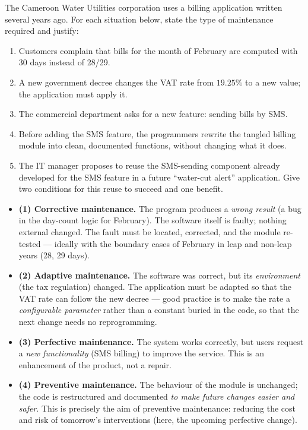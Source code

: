 \documentclass[11pt]{article}
\begin{document}
\begin{exoresolu}
The Cameroon Water Utilities corporation uses a billing application written several years ago. For each situation below, state the type of maintenance required and justify:
\begin{enumerate}
\item[(1)] Customers complain that bills for the month of February are computed with 30 days instead of 28/29.
\item[(2)] A new government decree changes the VAT rate from $19.25\%$ to a new value; the application must apply it.
\item[(3)] The commercial department asks for a new feature: sending bills by SMS.
\item[(4)] Before adding the SMS feature, the programmers rewrite the tangled billing module into clean, documented functions, without changing what it does.
\item[(5)] The IT manager proposes to reuse the SMS-sending component already developed for the SMS feature in a future ``water-cut alert'' application. Give two conditions for this reuse to succeed and one benefit.
\end{enumerate}
\tcblower
\begin{itemize}
\item \textbf{(1) Corrective maintenance.} The program produces a \emph{wrong result} (a bug in the day-count logic for February). The software itself is faulty; nothing external changed. The fault must be located, corrected, and the module re-tested — ideally with the boundary cases of February in leap and non-leap years (28, 29 days).
\item \textbf{(2) Adaptive maintenance.} The software was correct, but its \emph{environment} (the tax regulation) changed. The application must be adapted so that the VAT rate can follow the new decree — good practice is to make the rate a \emph{configurable parameter} rather than a constant buried in the code, so that the next change needs no reprogramming.
\item \textbf{(3) Perfective maintenance.} The system works correctly, but users request a \emph{new functionality} (SMS billing) to improve the service. This is an enhancement of the product, not a repair.
\item \textbf{(4) Preventive maintenance.} The behaviour of the module is unchanged; the code is restructured and documented \emph{to make future changes easier and safer}. This is precisely the aim of preventive maintenance: reducing the cost and risk of tomorrow's interventions (here, the upcoming perfective change).

\end{itemize}
\end{exoresolu}
\end{document}
